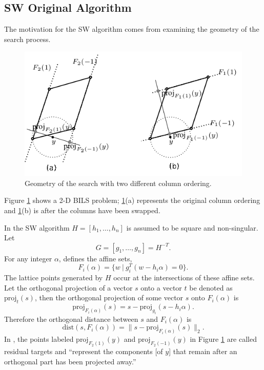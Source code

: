 \documentclass[12pt,Bold,letterpaper]{mcgilletdclass}
\newcommand{\dist}{\mathrm{dist}}
\newcommand{\vsp}{\vspace{\baselineskip}}
\begin{document}
\vsp \subsection{SW Original Algorithm} \label{subsec:SW}
The motivation for the SW algorithm comes from examining the geometry of the search process.

\ifx\du\undefined
  \newlength{\du}
\fi
\begin{figure}
\centering
\includegraphics[scale=0.7]{sumotivation.png}
\caption{Geometry of the search  with two different column ordering.}
\label{SEGeometry}
\end{figure}

Figure \ref{SEGeometry} shows a 2-D BILS problem;
\ref{SEGeometry}(a) represents the original column ordering and 
\ref{SEGeometry}(b) is after the columns have been swapped.

In the SW algorithm $H=[h_1,\ldots, h_n]$ is assumed to be square and non-singular.
Let 
$$
G =[g_1,\ldots, g_n]= H^{-T}.
$$ 
For any  integer $\alpha$,   \cite{SuW05} defines the
affine sets, $$F_i(\alpha) = \{w \ | \ g_i^T(w-h_i\alpha) = 0\}.$$
The lattice points generated by $H$ occur at the intersections of these affine sets. 
Let the orthogonal projection of a vector $s$ onto a vector $t$ be denoted as
$\mbox{proj}_t(s)$, then %
the orthogonal projection of some vector $s$ onto $F_i(\alpha)$ is 
$$\mbox{proj}_{F_i(\alpha)}(s) = s -\mbox{proj}_{g_i}(s-h_i\alpha).$$ 
Therefore the orthogonal distance between $s$ and
$F_i(\alpha)$ is $$\dist(s,F_i(\alpha)) =  \| s - \mbox{proj}_{F_i(\alpha)}(s) \|_2.$$
In \cite{SuW05}, the points labeled $\mbox{proj}_{F_2(1)}(y)$ and
$\mbox{proj}_{F_2(-1)}(y)$ in Figure \ref{SEGeometry}
are called residual targets  and ``represent the
components [of $y$] that remain after an orthogonal part has been projected
away.''  
\end{document}
